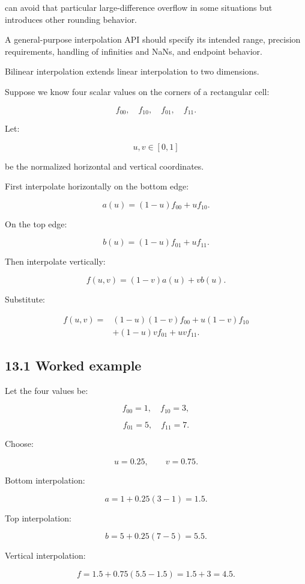can avoid that particular large-difference overflow in some situations but introduces other rounding behavior.

A general-purpose interpolation API should specify its intended range, precision requirements, handling of infinities and NaNs, and endpoint behavior.

Bilinear interpolation extends linear interpolation to two dimensions.

Suppose we know four scalar values on the corners of a rectangular cell:

\[ f_{00},\quad f_{10},\quad f_{01},\quad f_{11}. \]

Let:

\[ u,v\in[0,1] \]

be the normalized horizontal and vertical coordinates.

First interpolate horizontally on the bottom edge:

\[ a(u)=(1-u)f_{00}+uf_{10}. \]

On the top edge:

\[ b(u)=(1-u)f_{01}+uf_{11}. \]

Then interpolate vertically:

\[ f(u,v)=(1-v)a(u)+vb(u). \]

Substitute:

\[ \boxed{ \begin{aligned} f(u,v)=& (1-u)(1-v)f_{00} +u(1-v)f_{10}\\ &+(1-u)vf_{01} +uvf_{11}. \end{aligned} } \]

\subsection{13.1 Worked example}\label{02-foundations-ii-ch028-worked-example-2}

Let the four values be:

\[ f_{00}=1,\quad f_{10}=3, \]

\[ f_{01}=5,\quad f_{11}=7. \]

Choose:

\[ u=0.25,\qquad v=0.75. \]

Bottom interpolation:

\[ a=1+0.25(3-1)=1.5. \]

Top interpolation:

\[ b=5+0.25(7-5)=5.5. \]

Vertical interpolation:

\[ f=1.5+0.75(5.5-1.5) =1.5+3 =\boxed{4.5}. \]

